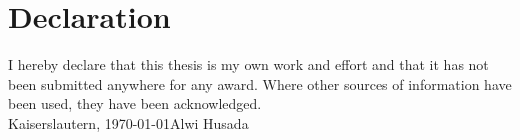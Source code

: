 
\chapter*{Declaration}
\thispagestyle{empty}
%
I hereby declare that this thesis is my own work and effort and that it has not
been submitted anywhere for any award. Where other sources of information have
been used, they have been acknowledged.
%
\mbox{}\vspace{4\baselineskip}\\
%
Kaiserslautern,  \today \hfill Alwi Husada
\clearpage\mbox{}\thispagestyle{empty}


%

